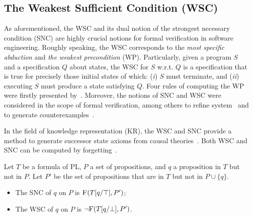 \documentclass[twoside,11pt]{article}
\begin{document}
\subsection{The Weakest Sufficient Condition (WSC)}
As aforementioned, the WSC and its dual notion of the strongest necessary condition (SNC) are highly crucial notions for formal verification in software engineering. Roughly speaking, the WSC corresponds to the \emph{most specific abduction} and {\em the weakest precondition} (WP).  Particularly,  given a program $S$ and a specification $Q$ about states,  the WSC for $S$ w.r.t. $Q$ is a specification that is true for precisely those initial states of which: (\emph{i}) $S$ must terminate, and (\emph{ii}) executing $S$ must produce a state satisfying $Q$.
Four rules of computing the WP were firstly presented by~.
Moreover, the notions of SNC and WSC were considered in the scope of formal verification, among others
 to refine system~\cite{woodcock1990refinement} and to generate counterexamples~\cite{dailler2018instrumenting}.

In the field of knowledge representation (KR), the WSC and SNC provide a method to generate successor state axioms from causal theories~\cite{lin2003compiling}. %
Both WSC and SNC can be computed by forgetting~\cite{DBLP:Lin:AIJ:2001,DBLP:conf/ijcai/DohertyLS01}.
\begin{theorem}
	Let $T$ be a formula of PL, $P$ a set of propositions, and $q$ a proposition in $T$ but not in $P$. Let $P'$ be the set of propositions that are in $T$ but not in $P\cup \{q\}$.
	\begin{itemize}
		\item The SNC of $q$ on $P$ is $\textsc{F}(T[q/\top],P')$;
		\item The WSC of $q$ on $P$ is  $\neg\textsc{F}(T[q/\bot],P')$.
	\end{itemize}
\end{theorem}
\end{document}
